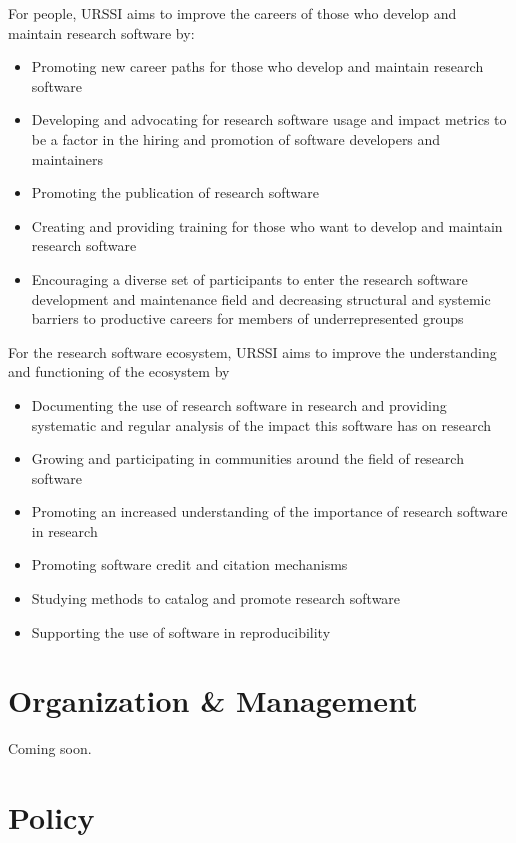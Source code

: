 \documentclass[
]{book}
\begin{document}
For people, URSSI aims to improve the careers of those who develop and maintain
research software by:

\begin{itemize}
\item
  Promoting new career paths for those who develop and maintain research software
\item
  Developing and advocating for research software usage and impact metrics to be
  a factor in the hiring and promotion of software developers and maintainers
\item
  Promoting the publication of research software
\item
  Creating and providing training for those who want to develop and maintain
  research software
\item
  Encouraging a diverse set of participants to enter the research software
  development and maintenance field and decreasing structural and systemic
  barriers to productive careers for members of underrepresented groups
\end{itemize}

For the research software ecosystem, URSSI aims to improve the understanding and functioning of the ecosystem by

\begin{itemize}
\item
  Documenting the use of research software in research and providing
  systematic and regular analysis of the impact this software has on research
\item
  Growing and participating in communities around the field of research software
\item
  Promoting an increased understanding of the importance of research software in research
\item
  Promoting software credit and citation mechanisms
\item
  Studying methods to catalog and promote research software
\item
  Supporting the use of software in reproducibility
\end{itemize}

\hypertarget{organization-management}{%
\chapter{Organization \& Management}\label{organization-management}}

Coming soon.

\hypertarget{policy}{%
\chapter{Policy}\label{policy}}
\end{document}
